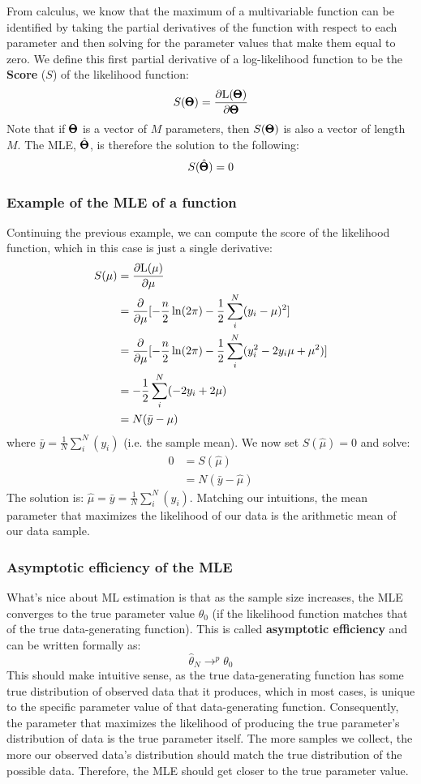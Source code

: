 \documentclass[12pt]{article}
\begin{document}
From calculus, we know that the maximum of a multivariable function can be identified by taking the partial derivatives of the function with respect to each parameter and then solving for the parameter values that make them equal to zero. We define this first partial derivative of a log-likelihood function to be the \textbf{Score} ($S$) of the likelihood function:
$$
S(\pmb{\Theta}) =
\frac{ \partial \mathrm{L} (\pmb{\Theta})
}{ \partial \pmb{\Theta} }
$$
Note that if $\pmb{\Theta}$ is a vector of $M$ parameters, then $S(\pmb{\Theta})$ is also a vector of length $M$.
The MLE, $\hat{\pmb{\Theta}}$, is therefore the solution to the following:
$$ S(\hat{\pmb{\Theta}}) = 0 $$

\subsubsection{Example of the MLE of a function}
Continuing the previous example, we can compute the score of the likelihood function, which in this case is just a single derivative:
\begin{align*}
S(\mu) &=
\frac{ \partial \mathrm{L} (\mu)
}{ \partial \mu } \\
&= \frac{ \partial }{ \partial \mu } [
- \frac{n}{2} \ln(2 \pi) -
\frac{1}{2} \sum_i^{N} (y_i - \mu)^2 ] \\
&= \frac{ \partial }{ \partial \mu } [
- \frac{n}{2} \ln(2 \pi) -
\frac{1}{2} \sum_i^{N} (y_i^2 - 2 y_i \mu + \mu^2) ] \\
&= - \frac{1}{2} \sum_i^{N} (- 2 y_i + 2 \mu) \\
&= N ( \bar{y} - \mu)
\end{align*}
where $\bar{y} = \frac{1}{N} \sum_i^N (y_i) $ (i.e. the sample mean). We now set $S(\hat{\mu}) = 0$ and solve:
\begin{align*}
0 &= S(\hat{\mu}) \\
&= N ( \bar{y} - \hat{\mu})
\end{align*}
The solution is: $\hat{\mu} = \bar{y} = \frac{1}{N} \sum_i^N (y_i)$.
Matching our intuitions, the mean parameter that maximizes the likelihood of our data is the arithmetic mean of our data sample.

\subsubsection{Asymptotic efficiency of the MLE}
What's nice about ML estimation is that as the sample size increases, the MLE converges to the true parameter value $\theta_0$ (if the likelihood function matches that of the true data-generating function).
This is called \textbf{asymptotic efficiency} and can be written formally as:
$$ \hat{\theta}_N \rightarrow^p \theta_0 $$
This should make intuitive sense, as the true data-generating function has some true distribution of observed data that it produces, which in most cases, is unique to the specific parameter value of that data-generating function.
Consequently, the parameter that maximizes the likelihood of producing the true parameter's distribution of data is the true parameter itself.
The more samples we collect, the more our observed data's distribution should match the true distribution of the possible data.
Therefore, the MLE should get closer to the true parameter value.
\end{document}
